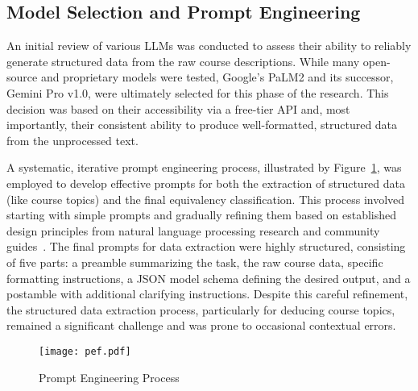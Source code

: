 \subsection{Model Selection and Prompt Engineering}
An initial review of various LLMs was conducted to assess their ability to reliably generate structured data from the raw course descriptions. While many open-source and proprietary models were tested, Google's PaLM2 and its successor, Gemini Pro v1.0, were ultimately selected for this phase of the research. This decision was based on their accessibility via a free-tier API and, most importantly, their consistent ability to produce well-formatted, structured data from the unprocessed text.

A systematic, iterative prompt engineering process, illustrated by Figure~\ref{fig:prompt_engineering_process}, was employed to develop effective prompts for both the extraction of structured data (like course topics) and the final equivalency classification. This process involved starting with simple prompts and gradually refining them based on established design principles from natural language processing research and community guides~\cite{ye2024promptengineeringpromptengineer,ppp,peg}. The final prompts for data extraction were highly structured, consisting of five parts: a preamble summarizing the task, the raw course data, specific formatting instructions, a JSON model schema defining the desired output, and a postamble with additional clarifying instructions. Despite this careful refinement, the structured data extraction process, particularly for deducing course topics, remained a significant challenge and was prone to occasional contextual errors.
\begin{figure}[tb]
    \captionsetup{skip=5pt}
    \centering
    \texttt{[image: pef.pdf]}
    \caption{Prompt Engineering Process}
    \label{fig:prompt_engineering_process}
\end{figure}

